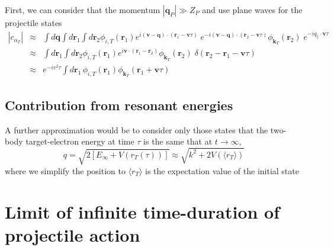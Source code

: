 First, we can consider that the momentum $|\bm{q}_{P}| \gg Z_{P}$ and
use plane waves for the projectile states
\begin{eqnarray} \label{Q:c-alfaT-appro-2}
|c_{\alpha_{T}}| &\approx& \int d \bm{q} \int d \bm{r}_{1} \int
d \bm{r}_{2} \phi_{i,T}(\bm{r}_{1}) e^{i (\bm{v}-\bm{q}) \cdot
(\bm{r}_{1} - \bm{v}\tau)} \; e^{-i (\bm{v}-\bm{q}) \cdot
(\bm{r}_{2} - \bm{v}\tau)} \phi_{\bm{k}_{T}}(\bm{r}_{2}) \;
e^{-i q_{\|}  \cdot \bm{v}\tau} \nonumber \\
&\approx& \int d \bm{r}_{1} \int d \bm{r}_{2}
\phi_{i,T}(\bm{r}_{1}) e^{i \bm{v} \cdot (\bm{r}_{1}-\bm{r}_{2})}
\phi_{\bm{k}_{T}}(\bm{r}_{2}) \;
\delta(\bm{r}_{2}-\bm{r}_{1}-\bm{v}\tau)
\\
&\approx& e^{-i v^{2} \tau} \int d \bm{r}_{1} \,
\phi_{i,T}(\bm{r}_{1}) \phi_{\bm{k}_{T}}(\bm{r}_{1} + \bm{v}\tau)
\end{eqnarray}


%

\subsection{Contribution from resonant energies}
\label{S:Contr-from-reson-energ}

A further approximation would be to consider only those states that the
two-body target-electron energy at time $\tau$ is the same that at $t
\to \infty$,
\begin{equation}\label{Q:Energ-shift}
q = \sqrt{2 [E_{\infty} + V(r_{T}(\tau))]} \approx \sqrt{k^{2} + 2
V(\langle r_{T} \rangle)}
\end{equation}
%
where we simplify the position to $\langle r_{T}\rangle$ is the
expectation value of the initial state

\section{Limit of infinite time-duration of projectile action}
\label{S:Limit-infin-time--proje-actio}

